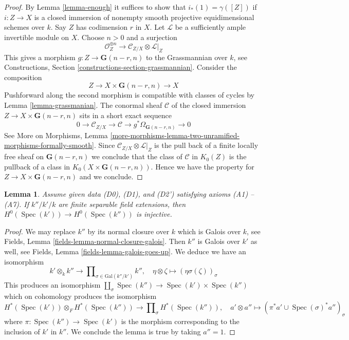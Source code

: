 \documentclass{stacks-project}
\theoremstyle{plain}
\newtheorem{lemma}[subsection]{Lemma}
\theoremstyle{definition}
\theoremstyle{remark}
\numberwithin{equation}{subsection}
\def\Spec{\mathop{\mathrm{Spec}}}
\begin{document}
\begin{proof}
By Lemma \ref{lemma-enough} it suffices to show that $i_*(1) = \gamma([Z])$
if $i : Z \to X$ is a closed immersion of nonempty
smooth projective equidimensional
schemes over $k$. Say $Z$ has codimension $r$ in $X$.
Let $\mathcal{L}$ be a sufficiently ample invertible module on $X$.
Choose $n > 0$ and a surjection
$$
\mathcal{O}_Z^{\oplus n} \to \mathcal{C}_{Z/X} \otimes \mathcal{L}|_Z
$$
This gives a morphism $g : Z \to \mathbf{G}(n - r, n)$
to the Grassmannian over $k$, see
Constructions, Section \ref{constructions-section-grassmannian}.
Consider the composition
$$
Z \to X \times \mathbf{G}(n - r, n) \to X
$$
Pushforward along the second morphism is compatible with classes
of cycles by Lemma \ref{lemma-grassmanian}. The conormal sheaf $\mathcal{C}$
of the closed immersion $Z \to X \times \mathbf{G}(n - r, n)$ sits in
a short exact sequence
$$
0 \to \mathcal{C}_{Z/X} \to \mathcal{C} \to
g^*\Omega_{\mathbf{G}(n - r, n)} \to 0
$$
See More on Morphisms, Lemma
\ref{more-morphisms-lemma-two-unramified-morphisms-formally-smooth}.
Since $\mathcal{C}_{Z/X} \otimes \mathcal{L}|_Z$ is the pull
back of a finite locally free sheaf on $\mathbf{G}(n - r, n)$
we conclude that the class of $\mathcal{C}$ in $K_0(Z)$
is the pullback of a class in $K_0(X \times \mathbf{G}(n - r, n))$.
Hence we have the property for $Z \to X \times \mathbf{G}(n - r, n)$
and we conclude.
\end{proof}

\begin{lemma}
\label{lemma-injective-H0}
Assume given data (D0), (D1), and (D2') satisfying axioms (A1) -- (A7).
If $k''/k'/k$ are finite separable field extensions, then
$H^0(\Spec(k')) \to H^0(\Spec(k''))$ is injective.
\end{lemma}

\begin{proof}
We may replace $k''$ by its normal closure over $k$
which is Galois over $k$, see
Fields, Lemma \ref{fields-lemma-normal-closure-galois}.
Then $k''$ is Galois over $k'$ as well, see
Fields, Lemma \ref{fields-lemma-galois-goes-up}.
We deduce we have an isomorphism
$$
k' \otimes_k k'' \longrightarrow
\prod\nolimits_{\sigma \in \text{Gal}(k''/k')} k'',\quad
\eta \otimes \zeta \longmapsto (\eta \sigma(\zeta))_\sigma
$$
This produces an isomorphism
$\coprod_\sigma \Spec(k'') \to \Spec(k') \times \Spec(k'')$
which on cohomology produces the isomorphism
$$
H^*(\Spec(k')) \otimes_F H^*(\Spec(k''))
\to
\prod\nolimits_\sigma H^*(\Spec(k'')),\quad
a' \otimes a'' \longmapsto (\pi^*a' \cup \Spec(\sigma)^*a'')_\sigma
$$
where $\pi : \Spec(k'') \to \Spec(k')$ is the morphism
corresponding to the inclusion of $k'$ in $k''$.
We conclude the lemma is true by taking $a'' = 1$.
\end{proof}
\end{document}
